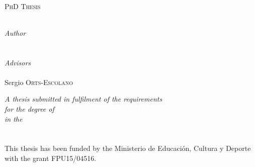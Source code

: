 \begin{titlepage}
\begin{center}

\textsc{\LARGE \univname}\\[1.5cm] %
\textsc{\Large PhD Thesis}\\[0.5cm] %

{\huge \bfseries \ttitle}\\[0.4cm] %
 
\begin{center} \large
\emph{Author}\\
{\authorname} %
\\\ \\
\emph{Advisors} \\
{\supname}\\ %
{Sergio \textsc{Orts-Escolano}}
\end{center}

\vfill
 
\large \textit{A thesis submitted in fulfilment of the requirements\\ for the degree of \degreename}\\[0.3cm] %
\textit{in the}\\[0.4cm]
\groupname\\\deptname\\[2cm] %
 
{\large This thesis has been funded by the Ministerio de Educación, Cultura y Deporte with the grant FPU15/04516.}\\[4cm] %
 
\end{center}
\end{titlepage}
